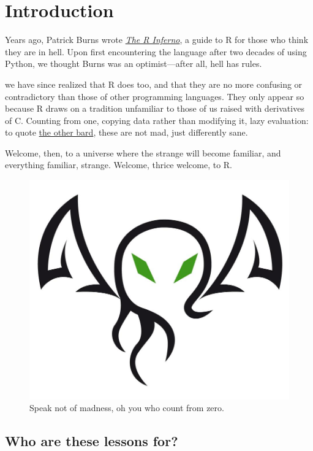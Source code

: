\chapter{Introduction}\label{introduction}

Years ago,
Patrick Burns wrote \emph{\href{https://www.burns-stat.com/documents/books/the-r-inferno/}{The R Inferno}},
a guide to R for those who think they are in hell.
Upon first encountering the language after two decades of using Python,
we thought Burns was an optimist---after all,
hell has rules.

we have since realized that R does too,
and that they are no more confusing or contradictory than those of other programming languages.
They only appear so because R draws on a tradition unfamiliar to those of us raised with derivatives of C.
Counting from one,
copying data rather than modifying it,
lazy evaluation:
to quote \href{https://www.terrypratchettbooks.com/sir-terry/}{the other bard},
these are not mad, just differently sane.

Welcome, then, to a universe where the strange will become familiar,
and everything familiar, strange.
Welcome, thrice welcome, to R.

\begin{figure}[h]
  \includegraphics[width=0.8\linewidth]{figures/index/cthulhu-900x759} 
  \caption{Speak not of madness, oh you who count from zero.}
  \label{fig:logo}
\end{figure}

\section{Who are these lessons for?}

